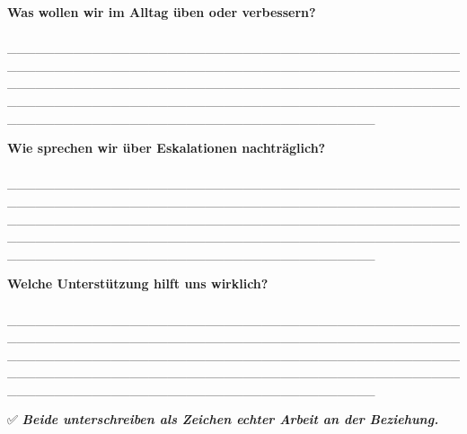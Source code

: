 \textbf{Was wollen wir im Alltag üben oder verbessern?}\\
📝 \_\_\_\_\_\_\_\_\_\_\_\_\_\_\_\_\_\_\_\_\_\_\_\_\_\_\_\_\_\_\_\_\_\_\_\_\_\_\_\_\_\_\_\_\_\_\_\_\_\_\_\_\_\_\_\_\_\_\_\_\_\_\_\_\_\_\_\_\_\_\_\_\_\_\_\_\_\_\_\_\_\_\_\_\_\_\_\_\_\_\_\_\_\_\_\_\_\_\_\_\_\_\_\_\_\_\_\_\_\_\_\_\_\_\_\_\_\_\_\_\_\_\_\_\_\_\_\_\_\_\_\_\_\_\_\_\_\_\_\_\_\_\_\_\_\_\_\_\_\_\_\_\_\_\_\_\_\_\_\_\_\_\_\_\_\_\_\_\_\_\_\_\_\_\_\_\_\_\_\_\_\_\_\_\_\_\_\_\_\_\_\_\_\_\_\_\_\_\_\_\_\_\_\_\_\_\_\_\_\_\_\_\_\_\_\_\_\_\_\_\_\_\_\_\_\_\_\_\_\_\_

\textbf{Wie sprechen wir über Eskalationen nachträglich?}\\
📝 \_\_\_\_\_\_\_\_\_\_\_\_\_\_\_\_\_\_\_\_\_\_\_\_\_\_\_\_\_\_\_\_\_\_\_\_\_\_\_\_\_\_\_\_\_\_\_\_\_\_\_\_\_\_\_\_\_\_\_\_\_\_\_\_\_\_\_\_\_\_\_\_\_\_\_\_\_\_\_\_\_\_\_\_\_\_\_\_\_\_\_\_\_\_\_\_\_\_\_\_\_\_\_\_\_\_\_\_\_\_\_\_\_\_\_\_\_\_\_\_\_\_\_\_\_\_\_\_\_\_\_\_\_\_\_\_\_\_\_\_\_\_\_\_\_\_\_\_\_\_\_\_\_\_\_\_\_\_\_\_\_\_\_\_\_\_\_\_\_\_\_\_\_\_\_\_\_\_\_\_\_\_\_\_\_\_\_\_\_\_\_\_\_\_\_\_\_\_\_\_\_\_\_\_\_\_\_\_\_\_\_\_\_\_\_\_\_\_\_\_\_\_\_\_\_\_\_\_\_\_\_

\textbf{Welche Unterstützung hilft uns wirklich?}\\
📝 \_\_\_\_\_\_\_\_\_\_\_\_\_\_\_\_\_\_\_\_\_\_\_\_\_\_\_\_\_\_\_\_\_\_\_\_\_\_\_\_\_\_\_\_\_\_\_\_\_\_\_\_\_\_\_\_\_\_\_\_\_\_\_\_\_\_\_\_\_\_\_\_\_\_\_\_\_\_\_\_\_\_\_\_\_\_\_\_\_\_\_\_\_\_\_\_\_\_\_\_\_\_\_\_\_\_\_\_\_\_\_\_\_\_\_\_\_\_\_\_\_\_\_\_\_\_\_\_\_\_\_\_\_\_\_\_\_\_\_\_\_\_\_\_\_\_\_\_\_\_\_\_\_\_\_\_\_\_\_\_\_\_\_\_\_\_\_\_\_\_\_\_\_\_\_\_\_\_\_\_\_\_\_\_\_\_\_\_\_\_\_\_\_\_\_\_\_\_\_\_\_\_\_\_\_\_\_\_\_\_\_\_\_\_\_\_\_\_\_\_\_\_\_\_\_\_\_\_\_\_\_

✅ \emph{\textbf{Beide unterschreiben als Zeichen echter Arbeit an der Beziehung.}}


